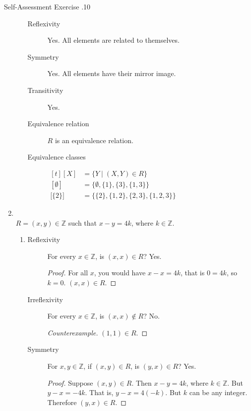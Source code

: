 \documentclass[../notes.tex]{subfiles}
\begin{document}
\begin{exercise}{Self-Assessment Exercise \thechapter.10}
\begin{enumerate}
\begin{enumerate}[label=(\alph*)]
\begin{description}
										\item[Reflexivity] Yes. All elements are related to themselves.
										\item[Symmetry] Yes. All elements have their mirror image.
										\item[Transitivity] Yes.
										\item[Equivalence relation] $R$ is an equivalence relation.
										\item[Equivalence classes] $
											\begin{aligned}[t]
												[X] &= \{Y \mid (X, Y) \in R\}\\
												[\emptyset] &= \bigl\{\emptyset, \{1\}, \{3\}, \{1, 3\}\bigr\}\\
												\bigl[\{2\}\bigr] &= \bigl\{\{2\}, \{1, 2\}, \{2, 3\}, \{1, 2, 3\}\bigr\}
											\end{aligned} $   
									\end{description}
							\end{enumerate}
						\item {}\\
							$R = (x, y) \in \mathbb{Z}$ such that $ x - y = 4k$, where $k \in \mathbb{Z}$.
							\begin{enumerate}[label=(\alph*)]
								\item {}
									\begin{description}
										\item[Reflexivity] For every $x \in \mathbb{Z}$, is $(x, x) \in R$? Yes.
											\begin{proof}
												For all $x$, you would have $x - x = 4k$, that is $0 = 4k$, so $k = 0$. $(x, x) \in R$.
											\end{proof}
										\item[Irreflexivity] For every $x \in \mathbb{Z}$, is $(x, x) \notin R$? No.
											\begin{proof}[Counterexample]
												$(1, 1) \in R$.
											\end{proof}
										\item[Symmetry] For $x, y \in \mathbb{Z}$, if $(x, y) \in R$, is $(y, x) \in R$? Yes.
											\begin{proof}
												Suppose $(x, y) \in R$. Then $x - y = 4k$, where $k \in \mathbb{Z}$. But $y - x = -4k$. That is, $y - x = 4(-k)$. But $k$ can be any integer. Therefore $(y, x) \in R$.

\end{proof}
\end{description}
\end{enumerate}
\end{enumerate}
\end{exercise}
\end{document}
